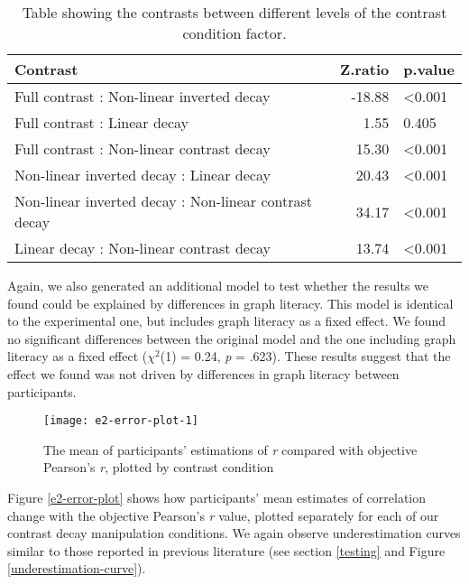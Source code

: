 \documentclass[preprint, 3p,
authoryear]{elsarticle} %
\begin{document}
\begin{table}

\caption{\label{tab:contrasts-table-e2}\label{contrasts-table-e2}Table showing the contrasts between different levels of the contrast condition factor.}
\centering
\begin{tabular}[t]{lrl}
\toprule
Contrast & Z.ratio & p.value\\
\midrule
Full contrast : Non-linear inverted decay & -18.88 & <0.001\\
Full contrast : Linear decay & 1.55 & 0.405\\
Full contrast : Non-linear contrast decay & 15.30 & <0.001\\
Non-linear inverted decay : Linear decay & 20.43 & <0.001\\
Non-linear inverted decay : Non-linear contrast decay & 34.17 & <0.001\\
\addlinespace
Linear decay : Non-linear contrast decay & 13.74 & <0.001\\
\bottomrule
\end{tabular}
\end{table}

Again, we also generated an additional model to test whether the results
we found could be explained by differences in graph literacy. This model
is identical to the experimental one, but includes graph literacy as a
fixed effect. We found no significant differences between the original
model and the one including graph literacy as a fixed effect
(\(\chi^2\)(1) = 0.24, \emph{p} = .623). These results suggest that the
effect we found was not driven by differences in graph literacy between
participants.

\begin{figure}

{\centering \texttt{[image: e2-error-plot-1]} 

}

\caption{\label{e2-error-plot}The mean of participants' estimations of \textit{r} compared with objective Pearson's \textit{r}, plotted by contrast condition}\label{fig:e2-error-plot}
\end{figure}

Figure \ref{e2-error-plot} shows how participants' mean estimates of
correlation change with the objective Pearson's \emph{r} value, plotted
separately for each of our contrast decay manipulation conditions. We
again observe underestimation curves similar to those reported in
previous literature (see section \ref{testing} and Figure
\ref{underestimation-curve}).
\end{document}
